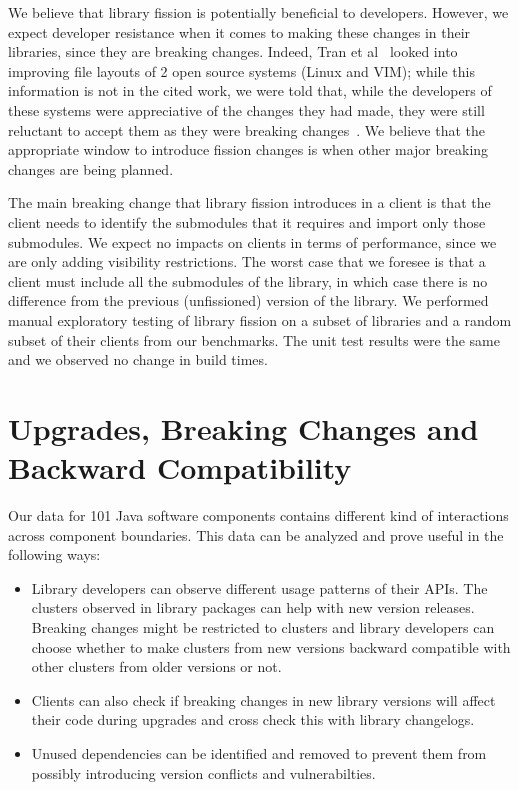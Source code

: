 We believe that library fission is potentially beneficial to developers. However, we expect developer resistance when it comes to making these changes in their libraries, since they are breaking changes. Indeed, Tran et al~\cite{tran2000architectural} looked into improving file layouts of 2 open source systems (Linux and VIM); while this information is not in the cited work, we were told that, while the developers of these systems were appreciative of the changes they had made, they were still reluctant to accept them as they were breaking changes~\cite{godfrey22}. We believe that the appropriate window to introduce fission changes is when other major breaking changes are being planned. 

The main breaking change that library fission introduces in a client is that the client needs to identify the submodules that it requires and import only those submodules. We expect no impacts on clients in terms of performance, since we are only adding visibility restrictions. The worst case that we foresee is that a client must include all the submodules of the library, in which case there is no difference from the previous (unfissioned) version of the library. We performed manual exploratory testing of library fission on a subset of libraries and a random subset of their clients from our benchmarks. The unit test results were the same and we observed no change in build times.

\section{Upgrades, Breaking Changes and Backward Compatibility}
Our data for 101 Java software components contains different kind of interactions across component boundaries. This data can be analyzed and prove useful in the following ways:
\begin{itemize}
\item Library developers can observe different usage patterns of their APIs. The clusters observed in library packages can help with new version releases. Breaking changes might be restricted to clusters and library developers can choose whether to make clusters from new versions backward compatible with other clusters from older versions or not. 
\item Clients can also check if breaking changes in new library versions will affect their code during upgrades and cross check this with library changelogs. 
\item Unused dependencies can be identified and removed to prevent them from possibly introducing version conflicts and vulnerabilties.
\end{itemize}
